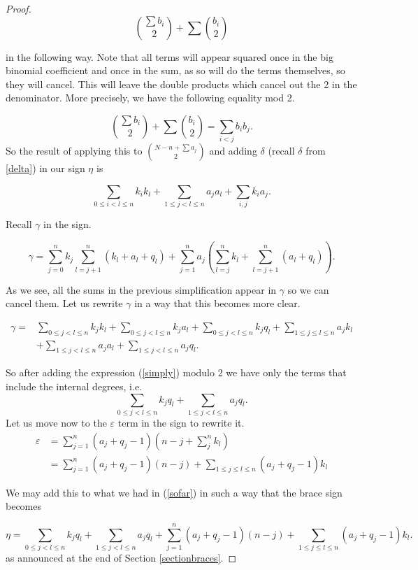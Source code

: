 \documentclass[Thesis.tex]{subfiles}
\begin{document}
\begin{proof}
\[\binom{\sum b_i}{2}+\sum\binom{b_i}{2}\]

in the following way. Note that all terms will appear squared once in the big binomial coefficient and once in the sum, as so will do the terms themselves, so they will cancel. This will leave the double products which cancel out the 2 in the denominator. More precisely, we have the following equality mod 2.

\[\binom{\sum b_i}{2}+\sum\binom{b_i}{2}=\sum_{i<j}b_ib_j.\]
So the result of applying this to $\binom{N-n+\sum a_j}{2}$ and adding $\delta$ (recall $\delta$ from \cref{delta}) in our sign $\eta$ is

\begin{equation}\label{simply}
\sum_{0\leq i<l\leq n}k_ik_l+\sum_{1\leq j<l\leq n}a_ja_l+\sum_{i,j}k_ia_j.
\end{equation}

Recall $\gamma$ in the sign.

\begin{equation*}\label{gamma}
\gamma= \sum_{j=0}^nk_j\sum_{l=j+1}^n(k_l+a_l+q_l)+\sum_{j=1}^na_j(\sum_{l=j}^nk_l+\sum_{l=j+1}^n(a_l+q_l)).
\end{equation*}

As we see, all the sums in the previous simplification appear in $\gamma$ so we can cancel them. Let us rewrite $\gamma$ in a way that this becomes more clear.

\begin{align*}
\gamma =& \sum_{0\leq j<l\leq n}k_jk_l+\sum_{0\leq j<l\leq n}k_ja_l+\sum_{0\leq j<l\leq n}k_jq_l+\sum_{1\leq j\leq l\leq n}a_jk_l\\
&+\sum_{1\leq j<l\leq n}a_ja_l+\sum_{1\leq j<l\leq n}a_jq_l.
\end{align*}

So after adding the expression (\ref{simply}) modulo 2 we have only the terms that include the internal degrees, i.e.
\begin{equation}\label{sofar}
\sum_{0\leq j<l\leq n}k_jq_l+\sum_{1\leq j<l\leq n}a_jq_l.
\end{equation}
Let us move now to the $\varepsilon$ term in the sign to rewrite it. 
\begin{align*}
\varepsilon&=\sum_{j=1}^n (a_j+q_j-1)(n-j+\sum_j^n k_l)\\
&=\sum_{j=1}^n (a_j+q_j-1)(n-j)+\sum_{1\leq j\leq l\leq n} (a_j+q_j-1)k_l
\end{align*}

We may add this to what we had in (\ref{sofar}) in such a way that the brace sign becomes

\begin{equation}\label{eta}
\eta=\sum_{0\leq j<l\leq n}k_jq_l+\sum_{1\leq j<l\leq n}a_jq_l+\sum_{j=1}^n (a_j+q_j-1)(n-j)+\sum_{1\leq j\leq l\leq n} (a_j+q_j-1)k_l.
\end{equation}
as announced at the end of Section \ref{sectionbraces}.
\end{proof}
\end{document}

